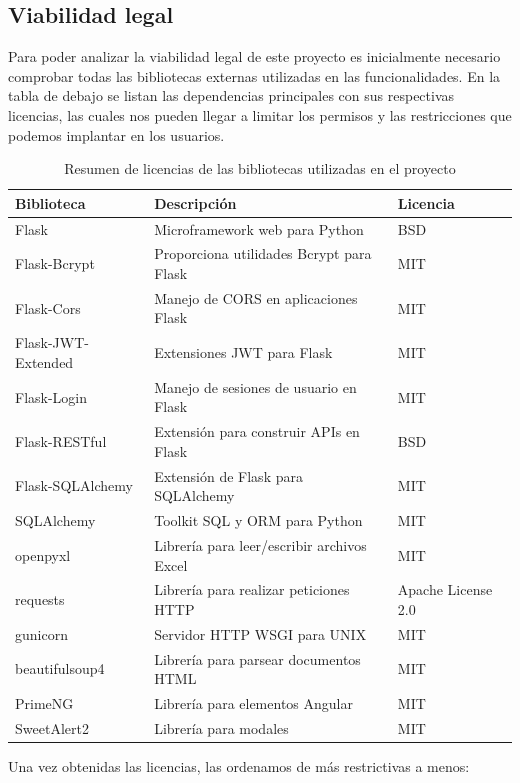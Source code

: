 \subsection{Viabilidad legal}
Para poder analizar la viabilidad legal de este proyecto es inicialmente necesario comprobar todas las bibliotecas externas utilizadas en las funcionalidades.
En la tabla de debajo se listan las dependencias principales con sus respectivas licencias, las cuales nos pueden llegar a limitar los permisos y las restricciones que podemos implantar en los usuarios.

\begin{table}[ht]
\centering
\begin{tabular}{@{}lll@{}}
\toprule
Biblioteca & Descripción & Licencia \\ 
\midrule
Flask & Microframework web para Python & BSD \\
Flask-Bcrypt & Proporciona utilidades Bcrypt para Flask & MIT \\
Flask-Cors & Manejo de CORS en aplicaciones Flask & MIT \\
Flask-JWT-Extended & Extensiones JWT para Flask & MIT \\
Flask-Login & Manejo de sesiones de usuario en Flask & MIT \\
Flask-RESTful & Extensión para construir APIs en Flask & BSD \\
Flask-SQLAlchemy & Extensión de Flask para SQLAlchemy & MIT \\
SQLAlchemy & Toolkit SQL y ORM para Python & MIT \\
openpyxl & Librería para leer/escribir archivos Excel & MIT \\
requests & Librería para realizar peticiones HTTP & Apache License 2.0 \\
gunicorn & Servidor HTTP WSGI para UNIX & MIT \\
beautifulsoup4 & Librería para parsear documentos HTML & MIT \\
PrimeNG & Librería para elementos Angular & MIT \\
SweetAlert2 & Librería para modales & MIT \\
\bottomrule
\end{tabular}
\caption{Resumen de licencias de las bibliotecas utilizadas en el proyecto}
\end{table}
\FloatBarrier
Una vez obtenidas las licencias, las ordenamos de más restrictivas a menos:
